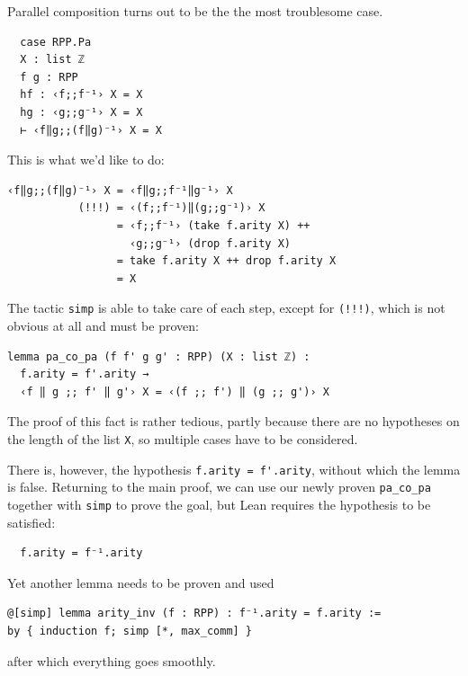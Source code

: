 \documentclass[oneside]{book}
\theoremstyle{definition}
\theoremstyle{remark}
\theoremstyle{plain}
\begin{document}
Parallel composition turns out to be the the most troublesome case.
\begin{lstlisting}
  case RPP.Pa
  X : list ℤ
  f g : RPP
  hf : ‹f;;f⁻¹› X = X
  hg : ‹g;;g⁻¹› X = X
  ⊢ ‹f‖g;;(f‖g)⁻¹› X = X
\end{lstlisting}
This is what we'd like to do:
\begin{lstlisting}
‹f‖g;;(f‖g)⁻¹› X = ‹f‖g;;f⁻¹‖g⁻¹› X
           (!!!) = ‹(f;;f⁻¹)‖(g;;g⁻¹)› X
                 = ‹f;;f⁻¹› (take f.arity X) ++
                   ‹g;;g⁻¹› (drop f.arity X)
                 = take f.arity X ++ drop f.arity X
                 = X
\end{lstlisting}
The tactic \lstinline{simp} is able to take care of each step, except for \lstinline{(!!!)},
which is not obvious at all and must be proven:
\begin{lstlisting}
lemma pa_co_pa (f f' g g' : RPP) (X : list ℤ) :
  f.arity = f'.arity →
  ‹f ‖ g ;; f' ‖ g'› X = ‹(f ;; f') ‖ (g ;; g')› X
\end{lstlisting}
The proof of this fact is rather tedious, partly because there are no hypotheses on the length of the list \lstinline{X},
so multiple cases have to be considered.

There is, however, the hypothesis \lstinline{f.arity = f'.arity}, without which the lemma is false.
Returning to the main proof, we can use our newly proven \lstinline{pa_co_pa} together with \lstinline{simp} to prove the goal,
but Lean requires the hypothesis to be satisfied:
\begin{lstlisting}
  f.arity = f⁻¹.arity
\end{lstlisting}
Yet another lemma needs to be proven and used
\begin{lstlisting}
@[simp] lemma arity_inv (f : RPP) : f⁻¹.arity = f.arity :=
by { induction f; simp [*, max_comm] }
\end{lstlisting}
after which everything goes smoothly.
\end{document}
